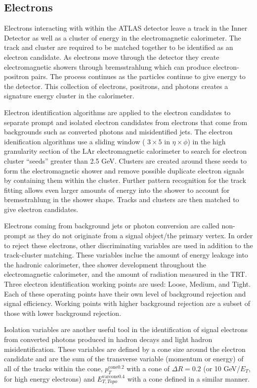 \subsection{Electrons}
Electrons interacting with within the ATLAS detector leave a track in the Inner Detector as well as a cluster of energy in the electromagnetic calorimeter.  The track and cluster are required to be matched together to be identified as an electron candidate\cite{ElectronID}.  As electrons move through the detector they create electromagnetic showers through bremsstrahlung which can produce electron-positron pairs.  The process continues as the particles continue to give energy to the detector.  This collection of electrons, positrons, and photons creates a signature energy cluster in the calorimeter.  

Electron identification algorithms are applied to the electron candidates to separate prompt and isolated electron candidates from electrons that come from backgrounds such as converted photons and misidentified jets.  The electron idenification algorithms use a sliding window ( $3\times5$ in $\eta \times \phi$) in the high granularity section of the LAr electromagnetic calorimeter to search for electron cluster ``seeds'' greater than 2.5 GeV.  Clusters are created around these seeds to form the electromagnetic shower and remove possible duplicate electron signals by containing them within the cluster.  Further pattern recognition for the track fitting allows even larger amounts of energy into the shower to account for bremsstrahlung in the shower shape.  Tracks and clusters are then matched to give electron candidates.  

Electrons coming from background jets or photon conversion are called non-prompt as they do not originate from a signal object/the primary vertex.  In order to reject these electrons, other discriminating variables are used in addition to the track-cluster matching.  These variables inclue the amount of energy leakage into the hadronic calorimeter, thee shower development throughout the electromagnetic calorimeter, and the amount of radiation measured in the TRT.  Three electron identification working points are used: Loose, Medium, and Tight.  Each of these operating points have their own level of background rejection and signal efficiency.  Working points with higher background rejection are a subset of those with lower background rejection.

Isolation variables are another useful tool in the identification of signal electrons from converted photons produced in hadron decays and light hadron misidentification.  These variables are defined by a cone size around the electron candidate and are the sum of the transverse variable (momentum or energy) of all of the tracks within the cone, $p_{T}^{\text{cone0.2}}$ with a cone of $\Delta R =0.2$ (or 10 GeV/$E_T$, for high energy electrons) and $E_{T, Topo}^{\text{varcone0.4}}$ with a cone defined in a similar manner.  


